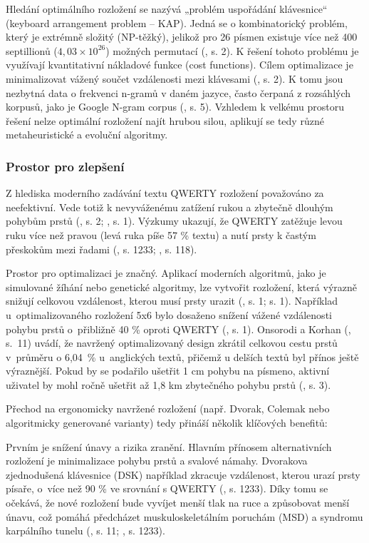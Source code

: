 \documentclass[a4paper, twoside, 12pt, czech]{article}
\begin{document}
Hledání optimálního rozložení se nazývá „problém uspořádání klávesnice“ (keyboard 
arrangement problem – KAP). Jedná se o kombinatorický problém, který je extrémně 
složitý (NP-těžký), jelikož pro 26 písmen existuje více než 400 septillionů 
($4,03\times10^{26}$) možných permutací (\cite{engramapproach}, s. 2). K řešení 
tohoto problému je využívají kvantitativní nákladové funkce (cost functions). 
Cílem optimalizace je minimalizovat vážený součet vzdálenosti mezi klávesami 
(\cite{7814594}, s. 2). K tomu jsou nezbytná data o frekvenci n-gramů v daném 
jazyce, často čerpaná z rozsáhlých korpusů, jako je Google N-gram corpus 
(\cite{engramapproach}, s. 5). Vzhledem k velkému prostoru řešení nelze optimální 
rozložení najít hrubou silou, aplikují se tedy různé metaheuristické a evoluční 
algoritmy.

\subsubsection{Prostor pro zlepšení}
Z hlediska moderního zadávání textu QWERTY rozložení považováno za 
neefektivní. Vede totiž k nevyváženému zatížení rukou a zbytečně dlouhým pohybům 
prstů (\cite{applicationAlgo}, s. 2; \cite{7814594}, s. 1). Výzkumy ukazují, že QWERTY zatěžuje levou ruku více než pravou 
(levá ruka píše 57 \% textu) a nutí prsty k častým přeskokům mezi řadami 
(\cite{qwerty-dilemma}, s. 1233; \cite{qwerty-immortal}, s. 118).

Prostor pro optimalizaci je značný. Aplikací moderních algoritmů, jako je 
simulované žíhání nebo genetické algoritmy, lze vytvořit rozložení, která 
výrazně snižují celkovou vzdálenost, kterou musí prsty urazit 
(\cite{applicationAlgo}, s. 1; \cite{7814594} s. 1). Například u~optimalizovaného
rozložení 5x6 bylo dosaženo snížení vážené vzdálenosti pohybu 
prstů o~přibližně 40 \% oproti QWERTY (\cite{7814594}, s. 1). Onsorodi a Korhan (\cite{applicationAlgo}, s.~11) 
uvádí, že navržený 
optimalizovaný design zkrátil celkovou cestu prstů v~průměru o 6,04~\% u~anglických 
textů, přičemž u delších textů byl přínos ještě výrazněj\-ší. Pokud by 
se podařilo ušetřit 1 cm pohybu na písmeno, aktivní uživatel by mohl ročně 
ušetřit až 1,8 km zbytečného pohybu prstů (\cite{applicationAlgo}, s. 3).

Přechod na ergonomicky navržené rozložení (např. Dvorak, Colemak nebo 
algoritmicky generované varianty) tedy přináší několik klíčových benefitů:

Prvním je snížení únavy a rizika zranění. Hlavním přínosem alternativních 
rozložení je minimalizace pohybu prstů a svalové námahy. Dvorakova 
zjednodu\-šená klávesnice (DSK) například zkracuje vzdálenost, kterou urazí 
prsty písaře, o~více než 90 \% ve srovnání s QWERTY (\cite{qwerty-dilemma}, s. 1233). Díky tomu se očekává, 
že nové rozložení bude vyvíjet menší tlak na ruce a způsobovat menší únavu, 
což pomáhá předcházet muskuloskeletálním poruchám (MSD) a syndromu 
karpálního tunelu (\cite{applicationAlgo}, s. 11; \cite{qwerty-dilemma}, s. 1233).
\end{document}
